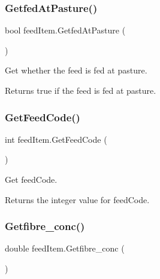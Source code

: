 \subsubsection{\texorpdfstring{GetfedAtPasture()}{GetfedAtPasture()}}
{\footnotesize\ttfamily bool feed\+Item.\+Getfed\+At\+Pasture (\begin{DoxyParamCaption}{ }\end{DoxyParamCaption})\hspace{0.3cm}{\ttfamily [inline]}}



Get whether the feed is fed at pasture. 

\begin{DoxyReturn}{Returns}
true if the feed is fed at pasture. 
\end{DoxyReturn}
\mbox{\label{classfeed_item_a15fbee7c871fe05f99c22347981e072b}} 
\subsubsection{\texorpdfstring{GetFeedCode()}{GetFeedCode()}}
{\footnotesize\ttfamily int feed\+Item.\+Get\+Feed\+Code (\begin{DoxyParamCaption}{ }\end{DoxyParamCaption})\hspace{0.3cm}{\ttfamily [inline]}}



Get feed\+Code. 

\begin{DoxyReturn}{Returns}
the integer value for feed\+Code. 
\end{DoxyReturn}
\mbox{\label{classfeed_item_a9d415fcfd784a6432d84401c45e62284}} 
\subsubsection{\texorpdfstring{Getfibre\_conc()}{Getfibre\_conc()}}
{\footnotesize\ttfamily double feed\+Item.\+Getfibre\+\_\+conc (\begin{DoxyParamCaption}{ }\end{DoxyParamCaption})\hspace{0.3cm}{\ttfamily [inline]}}



